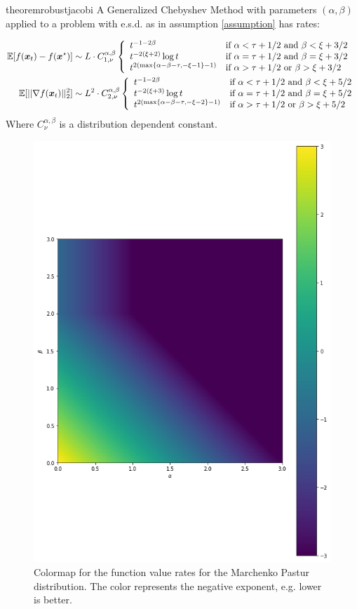 \documentclass{article}
\begin{document}
\begin{restatable}{theorem}{robustjacobi}\label{thm: jacobirates}
A Generalized Chebyshev Method with parameters $(\alpha,\beta)$ applied to a problem with e.s.d. as in assumption \ref{assumption} has rates:

\begin{align}
\mathbb{E}[f({\boldsymbol x}_t)-f({\boldsymbol x}^\star)]&\sim L\cdot C^{\alpha,\beta}_{1,\nu}
    \left\{\begin{array}{ll}
    t^{-1-2\beta} &\mbox{if } 
		  \alpha<\tau+1/2 \text{ and } \beta <\xi+3/2\\
		  t^{-2(\xi+2)}\log t& \mbox{if } 
		  \alpha=\tau+1/2 \text{ and } \beta =\xi+3/2\\
		  t^{2(\max\{\alpha-\beta-\tau,-\xi-1\}-1)}& \mbox{if } 
		  \alpha>\tau+1/2 \text{ or } \beta >\xi+3/2
	\end{array}\right.\\
	\mathbb{E}[||\nabla f({\boldsymbol x}_t)||^2_2]&\sim L^2\cdot C^{\alpha,\beta}_{2,\nu}
        \left\{\begin{array}{ll}
    t^{-1-2\beta} &\mbox{if } 
		  \alpha<\tau+1/2 \text{ and } \beta <\xi+5/2\\
		  t^{-2(\xi+3)}\log t& \mbox{if } 
		  \alpha=\tau+1/2 \text{ and } \beta =\xi+5/2\\
		  t^{2(\max\{\alpha-\beta-\tau,-\xi-2\}-1)}& \mbox{if } 
		  \alpha>\tau+1/2 \text{ or } \beta >\xi+5/2
	\end{array}\right.
\end{align}
Where $C^{\alpha,\beta}_\nu$ is a distribution dependent constant.
\end{restatable}
\begin{figure}[H]
    \centering
    \includegraphics[width=4 cm]{imgs/colormap.png}
    
    \caption{Colormap for the function value rates  for the Marchenko Pastur distribution. The color represents the negative exponent, e.g. lower is better.}
    \label{fig:my_label2}
\end{figure}
\end{document}
